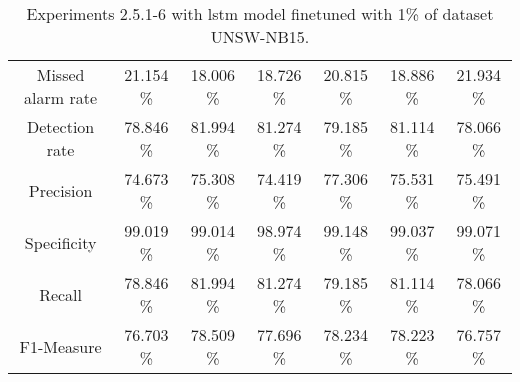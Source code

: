 \begin{table}[htb]
\begin{tabular}{@{}ccccccc@{}}
        Missed alarm rate &  21.154 \% &  18.006 \% &  18.726 \% &  20.815 \% &  18.886 \% &  21.934 \% \\
        Detection rate &  78.846 \% &  81.994 \% &  81.274 \% &  79.185 \% &  81.114 \% &  78.066 \% \\
        Precision &  74.673 \% &  75.308 \% &  74.419 \% &  77.306 \% &  75.531 \% &  75.491 \% \\
        Specificity &  99.019 \% &  99.014 \% &  98.974 \% &  99.148 \% &  99.037 \% &  99.071 \% \\
        Recall &  78.846 \% &  81.994 \% &  81.274 \% &  79.185 \% &  81.114 \% &  78.066 \% \\
        F1-Measure &  76.703 \% &  78.509 \% &  77.696 \% &  78.234 \% &  78.223 \% &  76.757 \% \\
        \bottomrule
    \end{tabular}
    \caption{Experiments 2.5.1-6 with \gls{lstm} model finetuned with 1\% of dataset UNSW-NB15.}
    \label{table:results:lstm:stats_flows15_10}
\end{table}